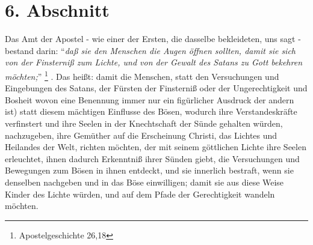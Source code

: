 \section{6. Abschnitt}

Das Amt der Apostel - wie einer der Ersten, die dasselbe bekleideten, uns sagt -
bestand darin: "`\textit{daß sie den Menschen die Augen öffnen sollten, damit sie
sich von der Finsterniß zum Lichte, und von der Gewalt des Satans zu Gott bekehren
möchten;}"' \footnote{Apostelgeschichte 26,18}
.
Das heißt: damit die Menschen, statt den 
Versuchungen und Eingebungen des Satans,  der Fürsten der
Finsterniß oder der Ungerechtigkeit und Bosheit  wovon eine Benennung immer nur
ein figürlicher Ausdruck der andern ist) statt diesem mächtigen Einflusse des
Bösen, wodurch ihre Verstandeskräfte verfinstert und ihre Seelen in der
Knechtschaft der Sünde gehalten würden, nachzugeben, ihre Gemüther auf die
Erscheinung Christi, das Lichtes und Heilandes der Welt, richten möchten, der
mit seinem göttlichen Lichte ihre Seelen erleuchtet, ihnen dadurch Erkenntniß
ihrer Sünden giebt, die Versuchungen und Bewegungen zum Bösen in ihnen entdeckt,
und sie innerlich bestraft, wenn sie denselben nachgeben und in das Böse
einwilligen; damit sie aus diese Weise Kinder des Lichte würden, und auf dem
Pfade der Gerechtigkeit wandeln möchten.

\medskip 

